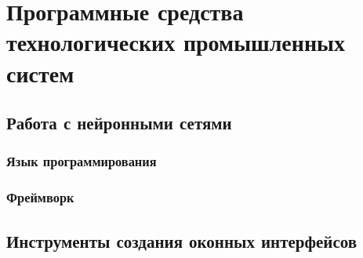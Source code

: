 \chapter{Программные средства технологических промышленных систем}

\section{Работа с нейронными сетями}

\subsection{Язык программирования}

\subsection{Фреймворк}

\section{Инструменты создания оконных интерфейсов}

